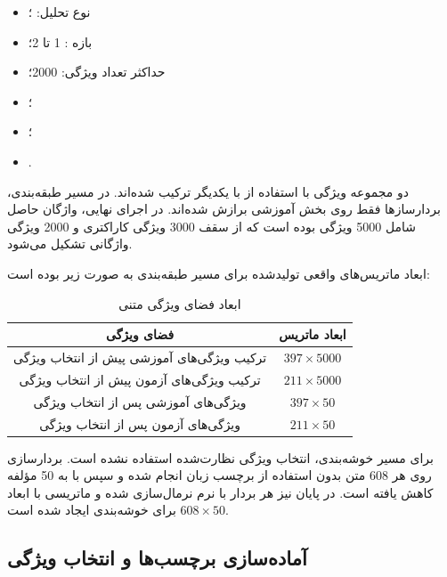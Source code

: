 \begin{itemize}

	\item نوع تحلیل:
	؛

	\item بازه
	:
	1 تا 2؛

	\item حداکثر تعداد ویژگی:
	2000؛

	\item
	؛

	\item
	؛

	\item
	.

\end{itemize}

دو مجموعه ویژگی با استفاده از
با یکدیگر ترکیب شده‌اند. در مسیر طبقه‌بندی، بردارسازها فقط روی بخش آموزشی برازش شده‌اند. در اجرای نهایی، واژگان حاصل شامل 5000 ویژگی بوده است که از سقف 3000 ویژگی کاراکتری و 2000 ویژگی واژگانی تشکیل می‌شود.

ابعاد ماتریس‌های واقعی تولیدشده برای مسیر طبقه‌بندی به صورت زیر بوده است:

\begin{table}[H]
\centering
\caption{ابعاد فضای ویژگی متنی}
\label{tab:text-feature-shapes}
\begin{tabular}{c c}
\toprule
\textbf{فضای ویژگی} & \textbf{ابعاد ماتریس} \\
\midrule
ترکیب ویژگی‌های آموزشی پیش از انتخاب ویژگی & $397 \times 5000$ \\
ترکیب ویژگی‌های آزمون پیش از انتخاب ویژگی & $211 \times 5000$ \\
ویژگی‌های آموزشی پس از انتخاب ویژگی & $397 \times 50$ \\
ویژگی‌های آزمون پس از انتخاب ویژگی & $211 \times 50$ \\
\bottomrule
\end{tabular}
\end{table}

برای مسیر خوشه‌بندی، انتخاب ویژگی نظارت‌شده
استفاده نشده است. بردارسازی روی هر 608 متن بدون استفاده از برچسب زبان انجام شده و سپس با
به 50 مؤلفه کاهش یافته است. در پایان نیز هر بردار با نرم
نرمال‌سازی شده و ماتریسی با ابعاد
$608\times50$
برای خوشه‌بندی ایجاد شده است.


\subsection{آماده‌سازی برچسب‌ها و انتخاب ویژگی}


